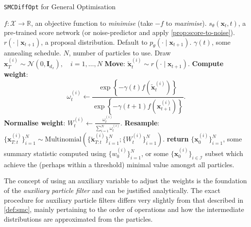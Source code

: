 \begin{algorithm}[ht]
    \caption{\texttt{SMCDiffOpt} for General Optimisation} \label{alg:smc-opt}
    \begin{algorithmic}
        \Require $f: \mathcal{X} \to \mathbb{R}$, an objective function to \emph{minimise} (take $-f$ to \emph{maximise}).
        \Require $s_\theta(\mathbf{x}_t, t)$, a pre-trained score network (or noise-predictor and apply \autoref{prop:score-to-noise}).
        \Require $r(\cdot \mid \mathbf{x}_{t+1})$, a proposal distribution. Default to $p_\theta(\cdot \mid \mathbf{x}_{t+1})$.
        \Require $\gamma(t)$, some annealing schedule.
        \Require $N$, number of particles to use.
        \State Draw $\mathbf{x}_T^{(i)} \sim \mathcal{N}(0, \mathbf{I}_{d_x}),\quad i=1,\ldots,N$
                \State \textbf{Move}: $\tilde{\mathbf{x}}_{t}^{(i)} \sim r(\cdot \mid \mathbf{x}_{t+1})$.
                \State \textbf{Compute weight}:
                \begin{equation}
                    \omega_t^{(i)} \gets \frac{\exp\left\{-\gamma(t) f(\tilde{\mathbf{x}}_t^{(i)})\right\}}{\exp\left\{-\gamma(t+1) f(\mathbf{x}_{t+1}^{(i)})\right\}}. \label{eq:weight-formula}
                \end{equation}
                \State \textbf{Normalise weight}: $W_t^{(i)} \gets \frac{\omega_t^{(i)}}{\sum_{i=1}^N \omega_t^{(i)}}$.
                \State \textbf{Resample}: $\{\mathbf{x}_{T:t}^{(i)}\}_{i=1}^N \sim \text{Multinomial}\left(\{\tilde{\mathbf{x}}_{T:t}^{(i)}\}_{i=1}^N; \{W_t^{(i)}\}_{i=1}^N\right)$.
            \EndFor
        \EndFor
        \State \textbf{return} $\{\mathbf{x}_0^{(i)}\}_{i=1}^N$, some summary statistic computed
        using $\{w_0^{(i)}\}_{i=1}^N$, or some $\{\mathbf{x}_0^{(i)}\}_{i \in \mathcal{I}}$
        subset which achieve the (perhaps within a threshold) minimal value amongst all particles.
    \end{algorithmic}
\end{algorithm}

\begin{remark}
    The concept of using an auxiliary variable to adjust the weights is the foundation of the
    \emph{auxiliary particle filter} \parencite{chopinIntroductionSequentialMonte2020} and can be
    justified analytically. The exact procedure for auxiliary particle filters differs very slightly
    from that described in \autoref{def:smc}, mainly pertaining to the order of operations and how the
    intermediate distributions are approximated from the particles.
\end{remark}

